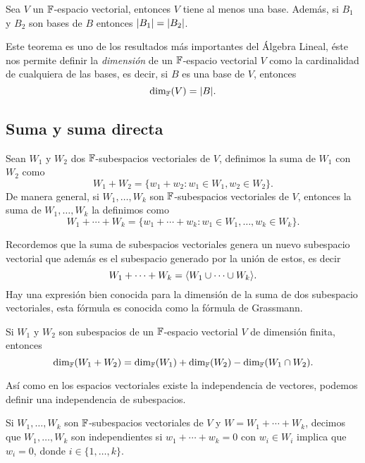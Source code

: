 \begin{teor}
  Sea $V$ un $\mathbb{F}$-espacio vectorial, entonces $V$ tiene al menos una base. Además, si $B_1$ y $B_2$ son bases de $B$ entonces $\mathopen|B_1\mathclose| = \mathopen|B_2\mathclose|$.
\end{teor}

Este teorema es uno de los resultados más importantes del Álgebra Lineal, éste nos permite definir la \emph{dimensión} de un $\mathbb{F}$-espacio vectorial $V$ como la cardinalidad de cualquiera de las bases, es decir, si $B$ es una base de $V$, entonces
\[ \dim_{\mathbb{F}} (V) = \mathopen|B\mathclose|. \]


\subsection{Suma y suma directa}

\begin{defi}
  Sean $W_1$ y $W_2$ dos $\mathbb{F}$-subespacios vectoriales de $V$, definimos la suma de $W_1$ con $W_2$ como
  \[ W_1 + W_2 = \{ w_1 + w_2 : w_1 \in W_1, w_2 \in W_2 \}.\]
  De manera general, si $W_1, \ldots, W_k$ son $\mathbb{F}$-subespacios vectoriales de $V$, entonces la suma de $W_1, \ldots, W_k$  la definimos como
  \[ W_1 + \cdots + W_k = \{ w_1 + \cdots + w_k : w_1 \in W_1, \ldots ,w_k \in W_k \}.\]
\end{defi}

Recordemos que la suma de subespacios vectoriales genera un nuevo subespacio vectorial que además es el subespacio generado por la unión de estos, es decir
  \[ W_1 + \cdots + W_k = \langle W_1 \cup \cdots \cup W_k \rangle. \]
Hay una expresión bien conocida para la dimensión de la suma de dos subespacio vectoriales, esta fórmula es conocida como la fórmula de Grassmann.

\begin{teor}
  Si $W_1$ y $W_2$ son subespacios de un $\mathbb{F}$-espacio vectorial $V$ de dimensión finita, entonces
    \[ \dim_{\mathbb{F}} (W_1 + W_2) = \dim_{\mathbb{F}} (W_1) + \dim_{\mathbb{F}} (W_2) - \dim_{\mathbb{F}} (W_1 \cap W_2).\]
\end{teor}


Así como en los espacios vectoriales existe la independencia de vectores, podemos definir una independencia de subespacios.

\begin{defi}
  Si $W_1, \ldots, W_k$ son $\mathbb{F}$-subespacios vectoriales de $V$ y $W = W_1 + \cdots + W_k$, decimos que  $W_1, \ldots, W_k$ son independientes si $w_1 + \cdots + w_k = 0$ con $w_i \in W_i$ implica que $w_i = 0$, donde $i \in \{1,\ldots,k\}$.
\end{defi}

